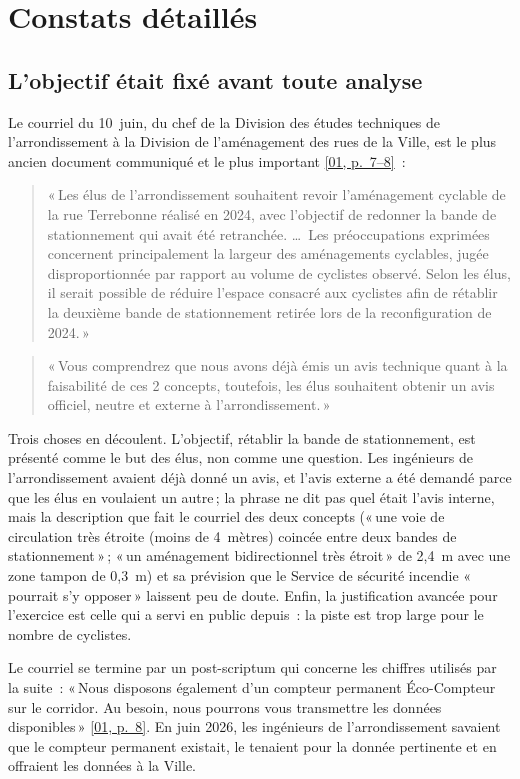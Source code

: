 \documentclass[11pt,letterpaper]{article}
\newcommand{\pagesurl}{https://openmobilitydata.github.io/Terrebonne-access-requests}
\newcommand{\pgl}[3]{\href{\pagesurl/\csname bundle#1\endcsname\#page=#2}{\textsf{\small[#1, p.~#3]}}}
\newcommand{\pg}[2]{\pgl{#1}{#2}{#2}}
\newcommand{\quot}[1]{\begin{quote}\small #1\end{quote}}
\begin{document}
\section{Constats détaillés}

\subsection{L'objectif était fixé avant toute analyse}

Le courriel du 10~juin, du chef de la Division des études techniques de
l'arrondissement à la Division de l'aménagement des rues de la Ville, est le
plus ancien document communiqué et le plus important \pgl{01}{7}{7--8}~:

\quot{«\,Les élus de l'arrondissement souhaitent revoir l'aménagement cyclable
de la rue Terrebonne réalisé en 2024, avec l'objectif de redonner la bande de
stationnement qui avait été retranchée. \ldots\ Les préoccupations
exprimées concernent principalement la largeur des aménagements cyclables,
jugée disproportionnée par rapport au volume de cyclistes observé. Selon
les élus, il serait possible de réduire l'espace consacré aux cyclistes
afin de rétablir la deuxième bande de stationnement retirée lors de la
reconfiguration de 2024.\,»}

\quot{«\,Vous comprendrez que nous avons déjà émis un avis technique quant
à la faisabilité de ces 2 concepts, toutefois, les élus souhaitent obtenir
un avis officiel, neutre et externe à l'arrondissement.\,»}

Trois choses en découlent. L'objectif, rétablir la bande de stationnement,
est présenté comme le but des élus, non comme une question. Les ingénieurs
de l'arrondissement avaient déjà donné un avis, et l'avis externe a été
demandé parce que les élus en voulaient un autre\,; la phrase ne dit pas
quel était l'avis interne, mais la description que fait le courriel des deux
concepts («\,une voie de circulation très étroite (moins de 4~mètres)
coincée entre deux bandes de stationnement\,»\,; «\,un aménagement
bidirectionnel très étroit\,» de 2,4~m avec une zone tampon de 0,3~m) et sa
prévision que le Service de sécurité incendie «\,pourrait s'y opposer\,»
laissent peu de doute. Enfin, la justification avancée pour l'exercice est
celle qui a servi en public depuis~: la piste est trop large pour le nombre
de cyclistes.

Le courriel se termine par un post-scriptum qui concerne les chiffres
utilisés par la suite~: «\,Nous disposons également d'un compteur permanent
Éco-Compteur sur le corridor. Au besoin, nous pourrons vous transmettre les
données disponibles\,» \pg{01}{8}. En juin 2026, les ingénieurs de
l'arrondissement savaient que le compteur permanent existait, le tenaient
pour la donnée pertinente et en offraient les données à la Ville.
\end{document}
